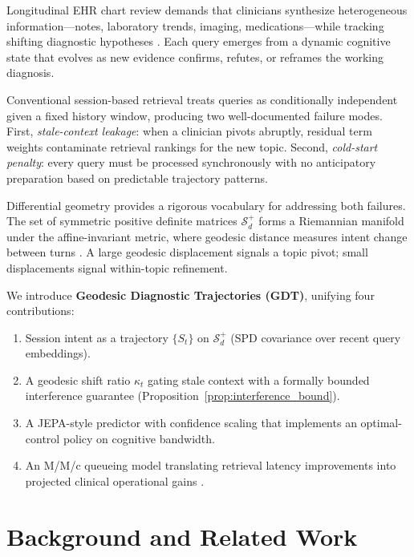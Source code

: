 \documentclass[11pt,a4paper]{article}
\begin{document}
Longitudinal EHR chart review demands that clinicians synthesize heterogeneous information---notes, laboratory trends, imaging, medications---while tracking shifting diagnostic hypotheses \cite{topol2019}. Each query emerges from a dynamic cognitive state that evolves as new evidence confirms, refutes, or reframes the working diagnosis.

Conventional session-based retrieval treats queries as conditionally independent given a fixed history window, producing two well-documented failure modes. First, \emph{stale-context leakage}: when a clinician pivots abruptly, residual term weights contaminate retrieval rankings for the new topic. Second, \emph{cold-start penalty}: every query must be processed synchronously with no anticipatory preparation based on predictable trajectory patterns.

Differential geometry provides a rigorous vocabulary for addressing both failures. The set of symmetric positive definite matrices $\mathcal{S}_d^+$ forms a Riemannian manifold under the affine-invariant metric, where geodesic distance measures intent change between turns \cite{pennec2006_spd}. A large geodesic displacement signals a topic pivot; small displacements signal within-topic refinement.

We introduce \textbf{Geodesic Diagnostic Trajectories (GDT)}, unifying four contributions:
\begin{enumerate}
  \item Session intent as a trajectory $\{S_t\}$ on $\mathcal{S}_d^+$ (SPD covariance over recent query embeddings).
  \item A geodesic shift ratio $\kappa_t$ gating stale context with a formally bounded interference guarantee (Proposition~\ref{prop:interference_bound}).
  \item A JEPA-style \cite{assran2023_ijepa} predictor with confidence scaling that implements an optimal-control policy on cognitive bandwidth.
  \item An M/M/c queueing model translating retrieval latency improvements into projected clinical operational gains \cite{kleinrock1975}.
\end{enumerate}

\section{Background and Related Work}
\label{sec:background}
\end{document}
